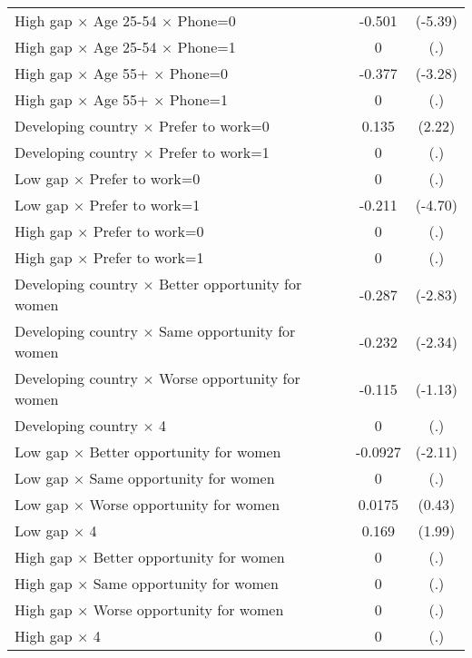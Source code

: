 {\begin{longtable}{l*{1}{cc}}
High gap $\times$ Age 25-54 $\times$ Phone=0&      -0.501\sym{***}&     (-5.39)\\
High gap $\times$ Age 25-54 $\times$ Phone=1&           0         &         (.)\\
High gap $\times$ Age 55+ $\times$ Phone=0&      -0.377\sym{**} &     (-3.28)\\
High gap $\times$ Age 55+ $\times$ Phone=1&           0         &         (.)\\
Developing country $\times$ Prefer to work=0&       0.135\sym{*}  &      (2.22)\\
Developing country $\times$ Prefer to work=1&           0         &         (.)\\
Low gap $\times$ Prefer to work=0&           0         &         (.)\\
Low gap $\times$ Prefer to work=1&      -0.211\sym{***}&     (-4.70)\\
High gap $\times$ Prefer to work=0&           0         &         (.)\\
High gap $\times$ Prefer to work=1&           0         &         (.)\\
Developing country $\times$ Better opportunity for women&      -0.287\sym{**} &     (-2.83)\\
Developing country $\times$ Same opportunity for women&      -0.232\sym{*}  &     (-2.34)\\
Developing country $\times$ Worse opportunity for women&      -0.115         &     (-1.13)\\
Developing country $\times$ 4&           0         &         (.)\\
Low gap $\times$ Better opportunity for women&     -0.0927\sym{*}  &     (-2.11)\\
Low gap $\times$ Same opportunity for women&           0         &         (.)\\
Low gap $\times$ Worse opportunity for women&      0.0175         &      (0.43)\\
Low gap $\times$ 4  &       0.169\sym{*}  &      (1.99)\\
High gap $\times$ Better opportunity for women&           0         &         (.)\\
High gap $\times$ Same opportunity for women&           0         &         (.)\\
High gap $\times$ Worse opportunity for women&           0         &         (.)\\
High gap $\times$ 4 &           0         &         (.)\\

\end{longtable}}
